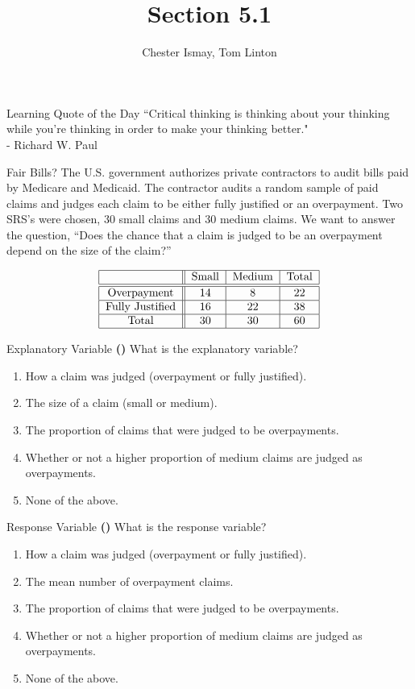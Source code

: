 \documentclass[13pt]{beamer}
\title{Section 5.1}
\author{Chester Ismay, Tom Linton}
\institute{Ripon College, Central College}
\date{}
\newcounter{count}
\newcommand{\quotes}[2]{\centering \Large{``#1"\\
\vspace*{0.2in}
\hspace*{0.5in} - #2}}
\newcommand{\question}{ \textbf{(\decimal{count})} \stepcounter{count}}
\newenvironment{click}{\begin{enumerate}[A]}{\end{enumerate}}
\begin{document}
\begin{frame}
  \titlepage
\end{frame}


\begin{frame}{Learning Quote of the Day}
\quotes{Critical thinking is thinking about your thinking while you're thinking in order to make your thinking better.}{Richard W. Paul}
\end{frame}

\begin{frame}{Fair Bills?}
The U.S. government authorizes private contractors to audit bills paid by Medicare and Medicaid. The contractor audits a random sample of paid claims and judges each claim to be either fully justified or an overpayment. Two SRS's were chosen, 30 small claims and 30 medium claims. We want to answer the question, ``Does the chance that a claim is judged to be an overpayment depend on the size of the claim?”

\[
\begin{tabular}{|c||c|c|c|}
\hline
& Small & Medium & Total \\ \hline\hline
Overpayment & 14 & 8 & 22 \\ \hline
Fully Justified & 16 & 22 & 38 \\ \hline
Total & 30 & 30 & 60 \\ \hline
\end{tabular}%
\]
\end{frame}

\begin{frame}{Explanatory Variable}
\question What is the explanatory variable?
\begin{click}
   \item How a claim was judged (overpayment or fully justified). 
   \item The size of a claim (small or medium). %
   \item The proportion of claims that were judged to be overpayments.
   \item Whether or not a higher proportion of medium claims are judged as overpayments.
   \item None of the above.
\end{click}
\end{frame}

\begin{frame}{Response Variable}
\question What is the response variable?
\begin{click}
   \item How a claim was judged (overpayment or fully justified). %
   \item The mean number of overpayment claims.
   \item The proportion of claims that were judged to be overpayments.
   \item Whether or not a higher proportion of medium claims are judged as overpayments.
   \item None of the above.
\end{click}
\end{frame}
\end{document}

